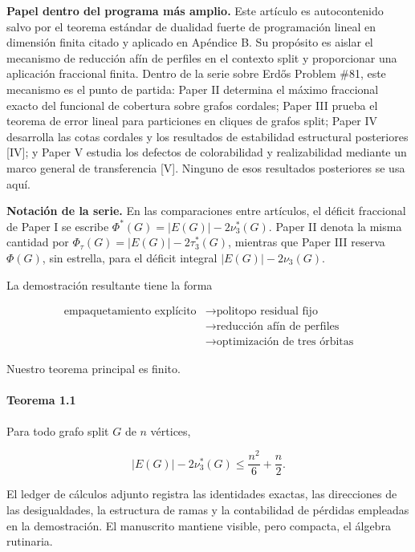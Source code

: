 \documentclass[spanish,11pt,a4paper]{article}
\begin{document}
\textbf{Papel dentro del programa más amplio.} Este artículo es
autocontenido salvo por el teorema estándar de dualidad fuerte de
programación lineal en dimensión finita citado y aplicado en Apéndice B.
Su propósito es aislar el mecanismo de reducción afín de perfiles en el
contexto split y proporcionar una aplicación fraccional finita. Dentro
de la serie sobre Erdős Problem \#81, este mecanismo es el punto de
partida: Paper II determina el máximo fraccional exacto del funcional de
cobertura sobre grafos cordales; Paper III prueba el teorema de error
lineal para particiones en cliques de grafos split; Paper IV desarrolla
las cotas cordales y los resultados de estabilidad estructural
posteriores {[}IV{]}; y Paper V estudia los defectos de colorabilidad y
realizabilidad mediante un marco general de transferencia {[}V{]}.
Ninguno de esos resultados posteriores se usa aquí.

\textbf{Notación de la serie.} En las comparaciones entre artículos, el
déficit fraccional de Paper I se escribe
\(\Phi^*(G)=|E(G)|-2\nu_3^*(G)\). Paper II denota la misma cantidad por
\(\Phi_\tau(G)=|E(G)|-2\tau_3^*(G)\), mientras que Paper III reserva
\(\Phi(G)\), sin estrella, para el déficit integral
\(|E(G)|-2\nu_3(G)\).

La demostración resultante tiene la forma

\[
\begin{aligned}
\text{empaquetamiento explícito}
&\longrightarrow
\text{politopo residual fijo}\\
&\longrightarrow
\text{reducción afín de perfiles}\\
&\longrightarrow
\text{optimización de tres órbitas}
\end{aligned}
\]

Nuestro teorema principal es finito.

\paragraph{Teorema 1.1}\label{teorema-1.1}

Para todo grafo split \(G\) de \(n\) vértices,

\[
|E(G)|-2\nu_3^*(G)
\le
\frac{n^2}{6}+\frac{n}{2}.
\]

El ledger de cálculos adjunto registra las identidades exactas, las
direcciones de las desigualdades, la estructura de ramas y la
contabilidad de pérdidas empleadas en la demostración. El manuscrito
mantiene visible, pero compacta, el álgebra rutinaria.
\end{document}
